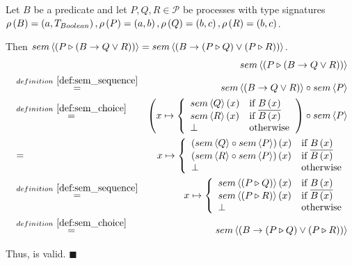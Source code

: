 \begin{myproof}
Let $B$ be a predicate and let $P, Q, R \in \mathcal{P}$ be processes with type signatures $\typesignature{B}{a}{T_{Boolean}}, \linebreak \typesignature{P}{a}{b}, \typesignature{Q}{b}{c}, \typesignature{R}{b}{c}$. 

Then $sem \left\langle \left( P \triangleright \left( B \to Q \vee R \right) \right) \right\rangle = sem \left\langle \left( B \to \left( P \triangleright Q \right) \vee \left( P \triangleright R \right) \right) \right\rangle$.
\begin{eqnarray*}
  & & \sem{\sequence{P}{\choice{B}{Q}{R}}} \\
  & \overset{\defref{def:sem_sequence}}{=} & \sem{\choice{B}{Q}{R}} \circ \sem{P} \\
  & \overset{\defref{def:sem_choice}}{=}   & \left( x \mapsto \left\{\begin{array}{ll}
                                                                       \sem{Q} \left( x \right) & \text{if } B \left( x \right) \\
                                                                       \sem{R} \left( x \right) & \text{if } \overline{B \left( x \right)} \\
                                                                       \bot & \text{otherwise}
                                                                     \end{array}
                                                              \right.\right) \circ \sem{P} \\
  & = & x \mapsto \left\{\begin{array}{ll}
                 \left( \sem{Q} \circ \sem{P} \right) \left( x \right) & \text{if } B \left( x \right) \\
                 \left( \sem{R} \circ \sem{P} \right) \left( x \right) & \text{if } \overline{B \left( x \right)} \\
                 \bot & \text{otherwise}
               \end{array}
        \right. \\
  & \overset{\defref{def:sem_sequence}}{=} & x \mapsto \left\{\begin{array}{ll}
                                                                      \sem{\sequence{P}{Q}} \left( x \right) & \text{if } B \left( x \right) \\
                                                                      \sem{\sequence{P}{R}} \left( x \right) & \text{if } \overline{B \left( x \right)} \\
                                                                      \bot & \text{otherwise}
                                                          \end{array}
                                                   \right. \\
  & \overset{\defref{def:sem_choice}}{=}   & \sem{\choice{B}{\sequence{P}{Q}}{\sequence{P}{R}}}
\end{eqnarray*}

\vspace*{-0.75em}
Thus,  is valid. \hfill$\blacksquare$
\end{myproof}
